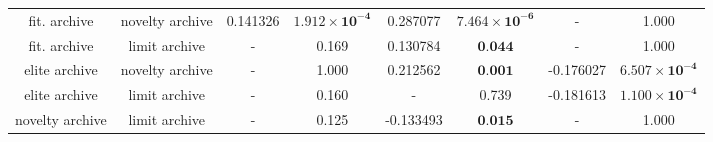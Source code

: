 \begin{tabular}{cccccccc}
   fit. archive & novelty archive &       0.141326 &  $\mathbf{1.912 \times 10^{-4}}$ &    0.287077 &  $\mathbf{7.464 \times 10^{-6}}$ &           - &                            1.000 \\
   fit. archive &   limit archive &              - &                            0.169 &    0.130784 &                 $\textbf{0.044}$ &           - &                            1.000 \\
  elite archive & novelty archive &              - &                            1.000 &    0.212562 &                 $\textbf{0.001}$ &   -0.176027 &  $\mathbf{6.507 \times 10^{-4}}$ \\
  elite archive &   limit archive &              - &                            0.160 &           - &                            0.739 &   -0.181613 &  $\mathbf{1.100 \times 10^{-4}}$ \\
novelty archive &   limit archive &              - &                            0.125 &   -0.133493 &                 $\textbf{0.015}$ &           - &                            1.000 \\
\bottomrule
\end{tabular}
